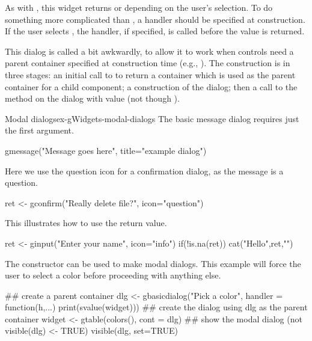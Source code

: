 As with , this widget returns  or
 depending on the user's selection. To do something more complicated than , a handler should be specified at construction. If the user selects
, the handler, if specified, is called before the value 
is returned. 

This dialog is called a bit awkwardly, to allow it to work when controls need a
parent container specified at construction time (e.g., ). The construction is in
three stages: an initial call to  to return a container which is used as
the parent container for a child component; a construction of the dialog; then a call to the
 method on the dialog with  value (not though ).


\begin{example}{Modal dialogs}{ex-gWidgets-modal-dialogs}
The basic message dialog requires just the first argument.
\begin{Schunk}
\begin{Sinput}
 gmessage("Message goes here", title="example dialog")
\end{Sinput}
\end{Schunk}

Here we use the question icon for a confirmation dialog, as the message is a question.
\begin{Schunk}
\begin{Sinput}
 ret <- gconfirm("Really delete file?", icon="question")
\end{Sinput}
\end{Schunk}

This illustrates how to use the return value.
\begin{Schunk}
\begin{Sinput}
 ret <- ginput("Enter your name", icon="info")
 if(!is.na(ret)) 
   cat("Hello",ret,"\n")
\end{Sinput}
\end{Schunk}

The  constructor can be used to make modal
dialogs. This example will force the user to
select a color before proceeding with anything else. 
\begin{Schunk}
\begin{Sinput}
 ## create a parent container
 dlg <- gbasicdialog("Pick a color", handler = 
                     function(h,...) print(svalue(widget)))
 ## create the dialog using dlg as the parent container
 widget <- gtable(colors(), cont = dlg)
 ## show the modal dialog (not visible(dlg) <- TRUE)
 visible(dlg, set=TRUE)    
\end{Sinput}
\end{Schunk}

\end{example}
















